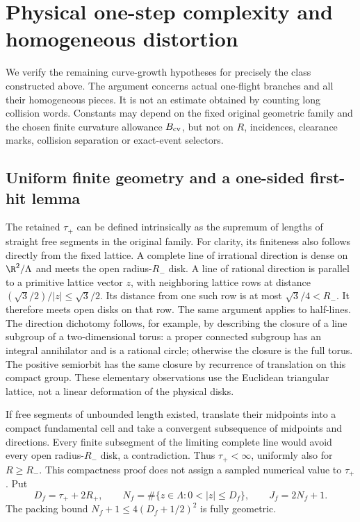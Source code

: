 \section{Physical one-step complexity and homogeneous distortion}
\label{sec:uc-complexity}
We verify the remaining curve-growth hypotheses for precisely the class
constructed above. The argument concerns actual one-flight branches and
all their homogeneous pieces. It is not an estimate obtained by counting
long collision words. Constants may depend on the fixed original geometric
family and the chosen finite curvature allowance $B_{\rm cv}$, but not on $R$,
incidences, clearance marks, collision separation or exact-event selectors.

\subsection{Uniform finite geometry and a one-sided first-hit lemma}
The retained $\tau_+$ can be defined intrinsically as the supremum of
lengths of straight free segments in the original family. For clarity, its
finiteness also follows directly from the fixed lattice. A complete line
of irrational direction is dense on $\R^2/\Lambda$ and meets the open
radius-$R_-$ disk. A line of rational direction is parallel to a primitive
lattice vector $z$, with neighboring lattice rows at distance
$(\sqrt3/2)/|z|\le\sqrt3/2$. Its distance from one such row is at most
$\sqrt3/4<R_-$. It therefore meets open disks on that row. The same
argument applies to half-lines. The direction dichotomy follows, for
example, by describing the closure of a line subgroup of a two-dimensional
torus: a proper connected subgroup has an integral annihilator and is a
rational circle; otherwise the closure is the full torus. The positive
semiorbit has the same closure by recurrence of translation on this compact
group. These elementary observations use the Euclidean triangular lattice,
not a linear deformation of the physical disks.

If free segments of unbounded length existed, translate their midpoints
into a compact fundamental cell and take a convergent subsequence of
midpoints and directions. Every finite subsegment of the limiting complete
line would avoid every open radius-$R_-$ disk, a contradiction. Thus
$\tau_+<\infty$, uniformly also for $R\ge R_-$. This compactness proof
does not assign a sampled numerical value to $\tau_+$.
Put
\begin{equation}\label{eq:uc-candidates}
 D_f=\tau_++2R_+,\qquad
 N_f=\#\{z\in\Lambda:0<|z|\le D_f\},\qquad J_f=2N_f+1.
\end{equation}
The packing bound $N_f+1\le4(D_f+1/2)^2$ is fully geometric.

